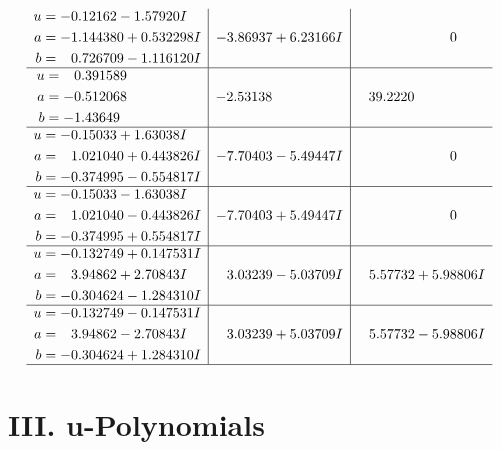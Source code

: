 \documentclass[1p]{elsarticle_modified}
\theoremstyle{definition}
\begin{document}
$$\begin{array}{c|c|c}
\begin{aligned}
u &= -0.12162 - 1.57920 I \\
a &= -1.144380 + 0.532298 I \\
b &= \phantom{-}0.726709 - 1.116120 I\end{aligned}
 & -3.86937 + 6.23166 I & \phantom{-0.000000 } 0 \\ \hline\begin{aligned}
u &= \phantom{-}0.391589\phantom{ +0.000000I} \\
a &= -0.512068\phantom{ +0.000000I} \\
b &= -1.43649\phantom{ +0.000000I}\end{aligned}
 & -2.53138\phantom{ +0.000000I} & \phantom{-}39.2220\phantom{ +0.000000I} \\ \hline\begin{aligned}
u &= -0.15033 + 1.63038 I \\
a &= \phantom{-}1.021040 + 0.443826 I \\
b &= -0.374995 - 0.554817 I\end{aligned}
 & -7.70403 - 5.49447 I & \phantom{-0.000000 } 0 \\ \hline\begin{aligned}
u &= -0.15033 - 1.63038 I \\
a &= \phantom{-}1.021040 - 0.443826 I \\
b &= -0.374995 + 0.554817 I\end{aligned}
 & -7.70403 + 5.49447 I & \phantom{-0.000000 } 0 \\ \hline\begin{aligned}
u &= -0.132749 + 0.147531 I \\
a &= \phantom{-}3.94862 + 2.70843 I \\
b &= -0.304624 - 1.284310 I\end{aligned}
 & \phantom{-}3.03239 - 5.03709 I & \phantom{-}5.57732 + 5.98806 I \\ \hline\begin{aligned}
u &= -0.132749 - 0.147531 I \\
a &= \phantom{-}3.94862 - 2.70843 I \\
b &= -0.304624 + 1.284310 I\end{aligned}
 & \phantom{-}3.03239 + 5.03709 I & \phantom{-}5.57732 - 5.98806 I\\
 \hline 
 \end{array}$$\newpage
\newpage\renewcommand{\arraystretch}{1}
\centering \section*{ III. u-Polynomials}
\end{document}

